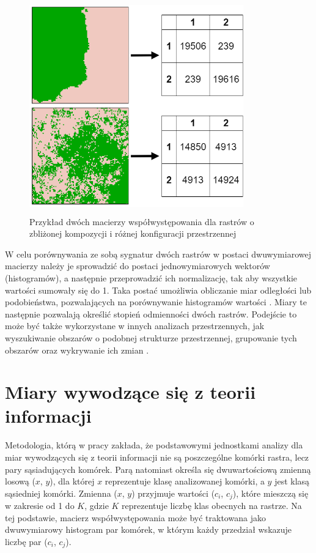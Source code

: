 \documentclass{amuthesis}
\begin{document}
\begin{figure}[t]

{\centering \includegraphics[width=3.64583in,height=3.64583in]{figures/diagram_coma.png}

}

\caption{\label{fig-metody-coma}Przykład dwóch macierzy
współwystępowania dla rastrów o zbliżonej kompozycji i różnej
konfiguracji przestrzennej}

\end{figure}

W celu porównywania ze sobą sygnatur dwóch rastrów w postaci
dwuwymiarowej macierzy należy je sprowadzić do postaci jednowymiarowych
wektorów (histogramów), a następnie przeprowadzić ich normalizację, tak
aby wszystkie wartości sumowały się do 1. Taka postać umożliwia
obliczanie miar odległości lub podobieństwa, pozwalających na
porównywanie histogramów wartości \autocite{Cha2007}. Miary te następnie
pozwalają określić stopień odmienności dwóch rastrów. Podejście to może
być także wykorzystane w innych analizach przestrzennych, jak
wyszukiwanie obszarów o podobnej strukturze przestrzennej, grupowanie
tych obszarów oraz wykrywanie ich zmian
\autocite{Jasiewicz_GeoPAT,nowosad_motif}.

\hypertarget{miary-wywodzux105ce-siux119-z-teorii-informacji}{%
\section{Miary wywodzące się z teorii
informacji}\label{miary-wywodzux105ce-siux119-z-teorii-informacji}}

Metodologia, którą w pracy \textcite{nowosad_it} zakłada, że
podstawowymi jednostkami analizy dla miar wywodzących się z teorii
informacji nie są poszczególne komórki rastra, lecz pary sąsiadujących
komórek. Parą natomiast określa się dwuwartościową zmienną losową
(\(x\), \(y\)), dla której \(x\) reprezentuje klasę analizowanej
komórki, a \(y\) jest klasą sąsiedniej komórki. Zmienna (\(x\), \(y\))
przyjmuje wartości (\(c_i\), \(c_j\)), które mieszczą się w zakresie od
1 do \(K\), gdzie \(K\) reprezentuje liczbę klas obecnych na rastrze. Na
tej podstawie, macierz współwystępowania może być traktowana jako
dwuwymiarowy histogram par komórek, w którym każdy przedział wskazuje
liczbę par (\(c_i\), \(c_j\)).
\end{document}
